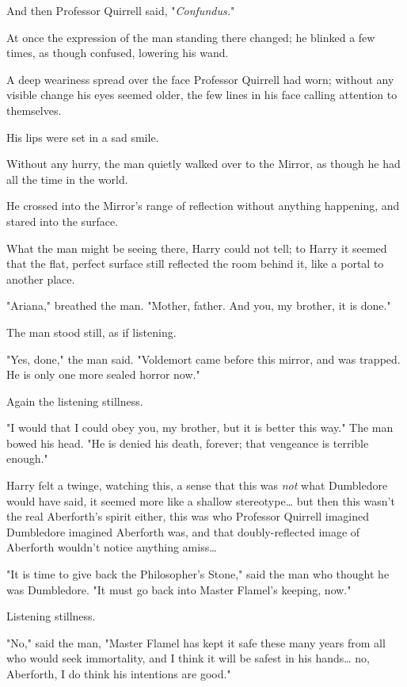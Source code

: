 And then Professor Quirrell said, "\emph{Confundus.}"

At once the expression of the man standing there changed; he blinked a few 
times, as though confused, lowering his wand.

A deep weariness spread over the face Professor Quirrell had worn; without any 
visible change his eyes seemed older, the few lines in his face calling 
attention to themselves.

His lips were set in a sad smile.

Without any hurry, the man quietly walked over to the Mirror, as though he had 
all the time in the world.

He crossed into the Mirror's range of reflection without anything happening, 
and stared into the surface.

What the man might be seeing there, Harry could not tell; to Harry it seemed 
that the flat, perfect surface still reflected the room behind it, like a 
portal to another place.

"Ariana," breathed the man. "Mother, father. And you, my brother, it is done."

The man stood still, as if listening.

"Yes, done," the man said. "Voldemort came before this mirror, and was trapped. 
He is only one more sealed horror now."

Again the listening stillness.

"I would that I could obey you, my brother, but it is better this way." The man 
bowed his head. "He is denied his death, forever; that vengeance is terrible 
enough."

Harry felt a twinge, watching this, a sense that this was \emph{not} what 
Dumbledore would have said, it seemed more like a shallow stereotype{\ldots} 
but then this wasn't the real Aberforth's spirit either, this was who Professor 
Quirrell imagined Dumbledore imagined Aberforth was, and that doubly-reflected 
image of Aberforth wouldn't notice anything amiss{\ldots}

"It is time to give back the Philosopher's Stone," said the man who thought he 
was Dumbledore. "It must go back into Master Flamel's keeping, now."

Listening stillness.

"No," said the man, "Master Flamel has kept it safe these many years from all 
who would seek immortality, and I think it will be safest in his hands{\ldots} 
no, Aberforth, I do think his intentions are good."

